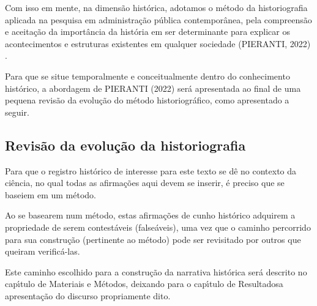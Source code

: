 \documentclass[
12pt,		%
openright,	%
twoside,  %
a4paper,			%
chapter=TITLE,		%
english,			%
french,				%
spanish,			%
brazil				%
]{USPSC-classe/USPSC}
\begin{document}
Com isso em mente, na dimens\~ao hist\'orica, adotamos o m\'etodo da historiografia aplicada na pesquisa em administra\c{c}\~ao p\'ublica contempor\^anea, pela compreens\~ao e aceita\c{c}\~ao da import\^ancia da hist\'oria em ser determinante para explicar os acontecimentos e estruturas existentes em qualquer sociedade (PIERANTI, 2022) .














Para que se situe temporalmente e conceitualmente dentro do conhecimento hist\'orico, a abordagem de  PIERANTI (2022) ser\'a apresentada ao final de uma pequena revis\~ao da evolu\c{c}\~ao do m\'etodo historiogr\'afico, como apresentado a seguir.














\subsection[Revis\~ao da evolu\c{c}\~ao da historiografia]{Revis\~ao da evolu\c{c}\~ao da historiografia}\label{Revis\~ao da evolu\c{c}\~ao da historiografia}
Para que o registro hist\'orico de interesse para este texto se d\^e no contexto da ci\^encia, no qual todas as afirma\c{c}\~oes aqui devem se inserir, \'e preciso que se baseiem em um m\'etodo.














Ao se basearem num m\'etodo, estas afirma\c{c}\~oes de cunho hist\'orico adquirem a propriedade de serem contest\'aveis (false\'aveis), uma vez que o caminho percorrido para sua constru\c{c}\~ao (pertinente ao m\'etodo) pode ser revisitado por outros que queiram verific\'a-las.














Este caminho escolhido para a constru\c{c}\~ao da narrativa hist\'orica ser\'a descrito no cap\'{\i}tulo de \textquotedbl Materiais e M\'etodos\textquotedbl , deixando para o cap\'{\i}tulo de \textquotedbl Resultados\textquotedbl  a apresenta\c{c}\~ao do discurso propriamente dito.
\end{document}
